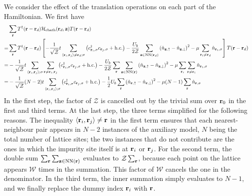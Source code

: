 \documentclass[reprint,hidelinks,onecolumn]{revtex4-2}
\begin{document}
We consider the effect of the translation operations on each part of the Hamiltonian. We first have
\begin{equation}\begin{aligned}
	&\sum_{{\bf r}}T^\dagger({\bf r} - {\bf r}_d)\mathcal{H}_\text{cbath}({\bf r}_d, {\bf z})T({\bf r} - {\bf r}_d) \\
	=& \sum_{{\bf r}}T^\dagger({\bf r} - {\bf r}_d)\left[-\frac{1}{\sqrt\mathcal{Z}}t\sum_{\left<{\bf r}_i, {\bf r}_j\right>\neq{\bf r}_d;\sigma}\left(c^\dagger_{{\bf r}_i,\sigma}c_{{\bf r}_j,\sigma} + \text{h.c.}\right) - \frac{U_b}{2\mathcal{Z}}\sum_{{\bf z}\in\text{NN}({\bf r}_d)}\left(\hat n_{{\bf z}, \uparrow} - \hat n_{{\bf z}, \downarrow}\right)^2 - \mu \sum_{{\bf r}_i \neq {\bf r}_d}\hat n_{{\bf r}_i,\sigma}\right]T({\bf r} - {\bf r}_d) \\
	=& -\frac{1}{\sqrt\mathcal{Z}}t\sum_{\left<{\bf r}_i, {\bf r}_j\right>;\sigma}\sum_{{\bf r}\neq{\bf r}_i,{\bf r}_j}\left(c^\dagger_{{\bf r}_i,\sigma}c_{{\bf r}_j,\sigma} + \text{h.c.}\right) - \frac{U_b}{2\mathcal{Z}}\sum_{\bf r}\sum_{{\bf z}\in\text{NN}\left({\bf r}\right)}\left(\hat n_{{\bf z}, \uparrow} - \hat n_{{\bf z}, \downarrow}\right)^2 - \mu \sum_{{\bf r}_i}\sum_{{\bf r} \neq {\bf r}_i}\hat n_{{\bf r}_i,\sigma}\\
	=& -\frac{1}{\sqrt\mathcal{Z}}(N-2)t\sum_{\left<{\bf r}_i, {\bf r}_j\right>;\sigma}\left(c^\dagger_{{\bf r}_i,\sigma}c_{{\bf r}_j,\sigma} + \text{h.c.}\right) - \frac{1}{2}U_b\sum_{\bf r}\left(\hat n_{{\bf r} , \uparrow} - \hat n_{{\bf r} , \downarrow}\right)^2 - \mu (N-1) \sum_{{\bf r}}\hat n_{{\bf r},\sigma}\\
\end{aligned}\end{equation}
In the first step, the factor of \(\mathcal{Z}\) is cancelled out by the trivial sum over \({\bf r}_0\) in the first and third terms. At the last step, the three terms simplified for the following reasons. The inequality \(\left<{\bf r}_i, {\bf r}_j\right>\neq{\bf r}\) in the first term ensures that each nearest-neighbour pair appears in \(N-2\) instances of the auxiliary model, \(N\) being the total number of lattice sites; the two instances that do not contribute are the ones in which the impurity site itself is at \({\bf r}_i\) or \({\bf r}_j\). For the second term, the double sum \(\sum_{\bf r}\sum_{{\bf z} \in \text{NN}({\bf r})}\) evaluates to \(\mathcal{Z}\sum_{\bf r}\), because each point on the lattice appears \(\mathcal{W}\) times in the summation. This factor of \(\mathcal{W}\) cancels the one in the denominator. In the third term, the inner summation simply evaluates to \(N-1\), and we finally replace the dummy index \({\bf r}_i\) with \({\bf r}\). 
\end{document}
